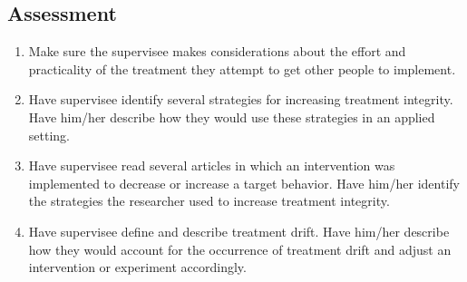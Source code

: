 \subsection{Assessment}
\begin{enumerate}
\item Make sure the supervisee makes considerations about the effort and practicality of the treatment they attempt to get other people to implement.
\item Have supervisee identify several strategies for increasing treatment integrity. Have him/her describe how they would use these strategies in an applied setting.
\item Have supervisee read several articles in which an intervention was implemented to decrease or increase a target behavior. Have him/her identify the strategies the researcher used to increase treatment integrity.
\item Have supervisee define and describe treatment drift. Have him/her describe how they would account for the occurrence of treatment drift and adjust an intervention or experiment accordingly.
%
\end{enumerate}
%
